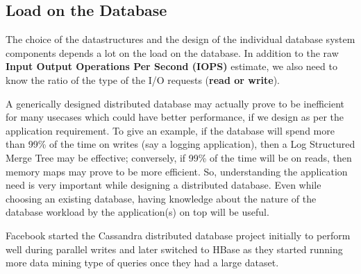 \subsection{Load on the Database}

The choice of the datastructures and the design of the individual database system components depends a lot on the load on the database. In addition to the raw \textbf{Input Output Operations Per Second (IOPS)} estimate, we also need to know the ratio of the type of the I/O requests (\textbf{read or write}). 

A generically designed distributed database may actually prove to be inefficient for many usecases which could have better performance, if we design as per the application requirement. To give an example, if the database will spend more than 99\% of the time on writes (say a logging application), then a Log Structured Merge Tree may be effective; conversely, if 99\% of the time will be on reads, then memory maps may prove to be more efficient. So, understanding the application need is very important while designing a distributed database. Even while choosing an existing database, having knowledge about the nature of the database workload by the application(s) on top will be useful.

Facebook started the Cassandra distributed database project initially to perform well during parallel writes and later switched to HBase as they started running more data mining type of queries once they had a large dataset.